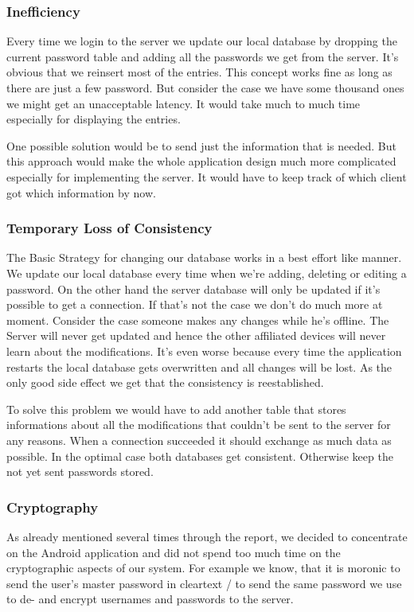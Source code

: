 \documentclass{report}
\begin{document}
\subsubsection{Inefficiency}
Every time we login to the server we update our local database by 
dropping the current password table and adding all the passwords we get from the server. It's obvious that we reinsert most of the entries. This concept works fine as long as there are just a few password. But consider the case we have some thousand ones we might get an unacceptable latency. It would take much to much time especially for displaying the entries. 

One possible solution would be to send just the information that is needed. But this approach would make the whole application design much more complicated especially for implementing the server. It would have to keep track of which client got which information by now.

\subsubsection{Temporary Loss of Consistency}
The Basic Strategy for changing our database works in a best effort like manner. We update our local database every time when we're adding, deleting or editing a password. On the other hand the server database will only be updated if it's possible to get a connection. If that's not the case we don't do much more at moment.
Consider the case someone makes any changes while he's offline. The Server will never get updated and hence the other affiliated devices will never learn about the modifications. It's even worse because every time the application restarts the local database gets overwritten and all changes will be lost. As the only good side effect we get that the consistency is reestablished.

To solve this problem we would have to add another table that stores informations about all the modifications that couldn't be sent to the server for any reasons. When a connection succeeded it should exchange as much data as possible. In the optimal case both databases get consistent. Otherwise keep the not yet sent passwords stored. 

\subsubsection{Cryptography}
As already mentioned several times through the report, we decided to concentrate on the Android application and did not spend too much time on the cryptographic aspects of our system. For example we know, that it is moronic to send the user's master password in cleartext / to send the same password we use to de- and encrypt usernames and passwords to the server.
\end{document}
